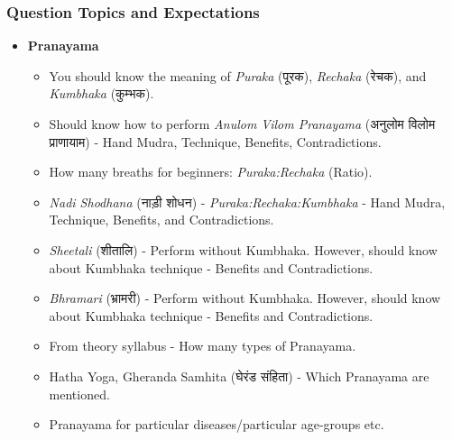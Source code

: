 \begin{frame}[fragile]\frametitle{Question Topics and Expectations}
    \begin{itemize}
        \item \textbf{Pranayama}
        \begin{itemize}
            \item You should know the meaning of \textit{Puraka} (पूरक), \textit{Rechaka} (रेचक), and \textit{Kumbhaka} (कुम्भक).
            \item Should know how to perform \textit{Anulom Vilom Pranayama} (अनुलोम विलोम प्राणायाम) - Hand Mudra, Technique, Benefits, Contradictions.
            \item How many breaths for beginners: \textit{Puraka:Rechaka} (Ratio).
            \item \textit{Nadi Shodhana} (नाड़ी शोधन) - \textit{Puraka:Rechaka:Kumbhaka} - Hand Mudra, Technique, Benefits, and Contradictions.
            \item \textit{Sheetali} (शीतालि) - Perform without Kumbhaka. However, should know about Kumbhaka technique - Benefits and Contradictions.
            \item \textit{Bhramari} (भ्रामरी) - Perform without Kumbhaka. However, should know about Kumbhaka technique - Benefits and Contradictions.
            \item From theory syllabus - How many types of Pranayama.
            \item Hatha Yoga, Gheranda Samhita (घेरंड संहिता) - Which Pranayama are mentioned.
            \item Pranayama for particular diseases/particular age-groups etc.
        \end{itemize}		
    \end{itemize}
\end{frame}



